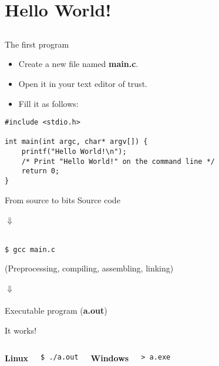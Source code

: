 \section{Hello World!}
\subsection{}
\begin{frame}[fragile]{The first program}
	\begin{itemize}
		\item Create a new file named \textbf{main.c}.
		\item Open it in your text editor of trust.
		\item Fill it as follows:
	\end{itemize}
	\begin{lstlisting}
#include <stdio.h>

int main(int argc, char* argv[]) {
	printf("Hello World!\n");
	/* Print "Hello World!" on the command line */
	return 0;
}
\end{lstlisting}
\end{frame}
\begin{frame}[fragile]{From source to bits}
	\centering
	Source code\\\ \\
	$\Downarrow$\\\ \\
	\begin{lstlisting}[numbers=none]
$ gcc main.c
\end{lstlisting}
(Preprocessing, compiling, assembling, linking)
	\ \\\ \\
	$\Downarrow$\\\ \\
	Executable program (\textbf{a.out})\\
\end{frame}
\begin{frame}[fragile]{It works!}
	\begin{columns}[T]
		\textbf{Linux}\\
		\begin{lstlisting}[numbers=none]
$ ./a.out
\end{lstlisting}
		\textbf{Windows}\\
		\begin{lstlisting}[numbers=none]
> a.exe
\end{lstlisting}
	\end{columns}
\end{frame}

